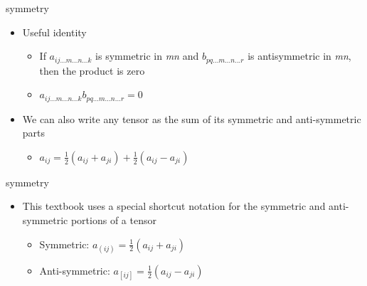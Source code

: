 \documentclass[
  letterpaper,
  ignorenonframetext,
  aspectratio=43,
  handout,
  12pt]{beamer}
\providecommand{\tightlist}{%
  \setlength{\itemsep}{0pt}\setlength{\parskip}{0pt}}
\providecommand{\tightlist}{%
\setlength{\itemsep}{0pt}\setlength{\parskip}{0pt}}
\begin{document}
\begin{frame}{symmetry}
\protect\hypertarget{symmetry-1}{}
\begin{itemize}
\tightlist
\item
  Useful identity

  \begin{itemize}
  \tightlist
  \item
    If \(a_{ij ... m ... n ... k}\) is symmetric in \emph{mn} and
    \(b_{pq ... m ... n ...r}\) is antisymmetric in \emph{mn}, then the
    product is zero
  \item
    \(a_{ij ... m ... n ... k} b_{pq ... m ... n ...r} = 0\)
  \end{itemize}
\item
  We can also write any tensor as the sum of its symmetric and
  anti-symmetric parts

  \begin{itemize}
  \tightlist
  \item
    \(a_{ij} = \frac{1}{2} (a_{ij} + a_{ji}) + \frac{1}{2} (a_{ij} - a_{ji})\)
  \end{itemize}
\end{itemize}
\end{frame}

\begin{frame}{symmetry}
\protect\hypertarget{symmetry-2}{}
\begin{itemize}
\tightlist
\item
  This textbook uses a special shortcut notation for the symmetric and
  anti-symmetric portions of a tensor

  \begin{itemize}
  \tightlist
  \item
    Symmetric: \(a_{(ij)} = \frac{1}{2}(a_{ij}+a_{ji})\)
  \item
    Anti-symmetric: \(a_{[ij]} = \frac{1}{2}(a_{ij}-a_{ji})\)
  \end{itemize}
\end{itemize}
\end{frame}
\end{document}
